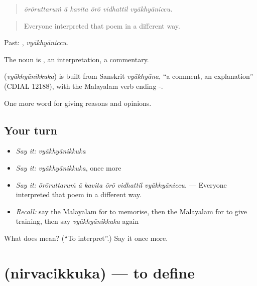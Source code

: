\begin{quote}
\emph{ōrōruttaruṁ ā kavita ōrō vidhattil vyākhyāniccu.}
\end{quote}

\begin{quote}
Everyone interpreted that poem in a different way.
\end{quote}

Past: , \emph{vyākhyāniccu}.

The noun is , an interpretation, a commentary.

\begin{cousinweb}
\textbf{} (\emph{vyākhyānikkuka}) is built from Sanskrit \emph{vyākhyāna}, \textquotedblleft{}a comment, an explanation\textquotedblright{} (CDIAL 12188), with the Malayalam verb ending -.
\end{cousinweb}

\begin{grammarlens}[title={What you've built}]
One more word for giving reasons and opinions.
\end{grammarlens}

\subsection*{Your turn}
\begin{itemize}
\raggedright
  \item \emph{Say it:} \emph{vyākhyānikkuka}
  \item \emph{Say it:} \emph{vyākhyānikkuka}, once more
  \item \emph{Say it:} \emph{ōrōruttaruṁ ā kavita ōrō vidhattil vyākhyāniccu.} — Everyone interpreted that poem in a different way.
  \item \emph{Recall:} say the Malayalam for to memorise, then the Malayalam for to give training, then say \emph{vyākhyānikkuka} again
\end{itemize}

\begin{tcolorbox}[breakable,colback=teal!4,colframe=teal!35!black,title={Before you move on}]
What does  mean? (\textquotedblleft{}To interpret\textquotedblright{}.) Say it once more.
\end{tcolorbox}
\section[\texorpdfstring{\ml{നിർവചിക്കുക} (nirvacikkuka)}{നിർവചിക്കുക (nirvacikkuka)}]{ (nirvacikkuka) — to define}

